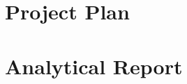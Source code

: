 \documentclass[12pt,a4paper]{article}
\begin{document}
\section{Project Plan}
\section{Analytical Report}
\end{document}
